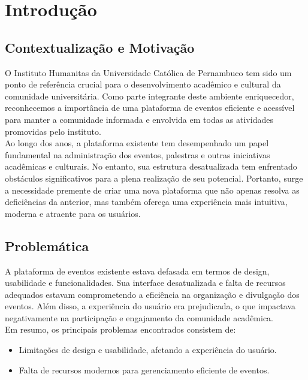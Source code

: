 \chapter{Introdução}

\section{Contextualização e Motivação}

O Instituto Humanitas da Universidade Católica de Pernambuco tem sido um ponto de referência crucial para o desenvolvimento acadêmico e cultural da comunidade universitária. Como parte integrante deste ambiente enriquecedor, reconhecemos a importância de uma plataforma de eventos eficiente e acessível para manter a comunidade informada e envolvida em todas as atividades promovidas pelo instituto. \\

Ao longo dos anos, a plataforma existente tem desempenhado um papel fundamental na administração dos eventos, palestras e outras iniciativas acadêmicas e culturais. No entanto, sua estrutura desatualizada tem enfrentado obstáculos significativos para a plena realização de seu potencial. Portanto, surge a necessidade premente de criar uma nova plataforma que não apenas resolva as deficiências da anterior, mas também ofereça uma experiência mais intuitiva, moderna e atraente para os usuários.

\section{Problemática}
A plataforma de eventos existente estava defasada em termos de design, usabilidade e funcionalidades. Sua interface desatualizada e falta de recursos adequados estavam comprometendo a eficiência na organização e divulgação dos eventos. Além disso, a experiência do usuário era prejudicada, o que impactava negativamente na participação e engajamento da comunidade acadêmica. \\

Em resumo, os principais problemas encontrados consistem de:

\begin{itemize}
    \item Limitações de design e usabilidade, afetando a experiência do usuário.
    \item Falta de recursos modernos para gerenciamento eficiente de eventos.
\end{itemize} 


